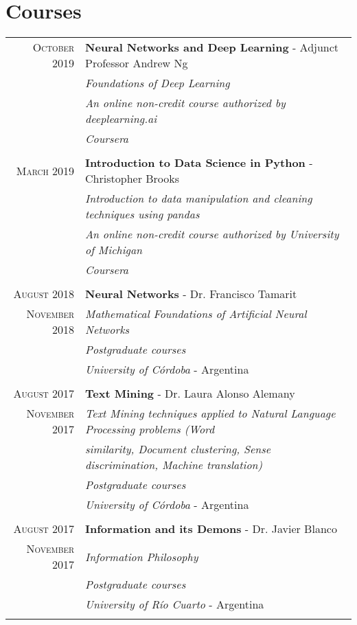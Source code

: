 \documentclass[a4paper,10pt]{article} %
\begin{document}
\section{Courses}
\begin{longtable}{rl}
\textsc{October} 2019 & \textbf{Neural Networks and Deep Learning} - Adjunct Professor Andrew Ng \\
& \textit{Foundations of Deep Learning}  \\
& \textit{An online non-credit course authorized by deeplearning.ai} \\
& \textit{Coursera} \\ & \\

\textsc{March} 2019 & \textbf{Introduction to Data Science in Python} - Christopher Brooks \\
& \textit{Introduction to data manipulation and cleaning techniques using pandas}  \\
& \textit{An online non-credit course authorized by University of Michigan} \\
& \textit{Coursera} \\ & \\

\textsc{August} 2018 & \textbf{Neural Networks} - Dr. Francisco Tamarit \\
\textsc{November} 2018 & \textit{Mathematical Foundations of Artificial Neural Networks}  \\ 
& \textit{Postgraduate courses} \\
& \textit{University of Córdoba} - Argentina \\ & \\

\textsc{August} 2017 & \textbf{Text Mining} - Dr. Laura Alonso Alemany \\
\textsc{November} 2017 & \textit{Text Mining techniques applied to Natural Language Processing problems (Word}  \\ 
& \textit{similarity, Document clustering, Sense discrimination, Machine translation)} \\
& \textit{Postgraduate courses} \\
& \textit{University of Córdoba} - Argentina \\ & \\

\textsc{August} 2017 & \textbf{Information and its Demons} - Dr. Javier Blanco \\
\textsc{November} 2017 & \textit{Information Philosophy} \\
& \textit{Postgraduate courses} \\
& \textit{University of Río Cuarto} - Argentina \\ & \\


\end{longtable}
\end{document}
